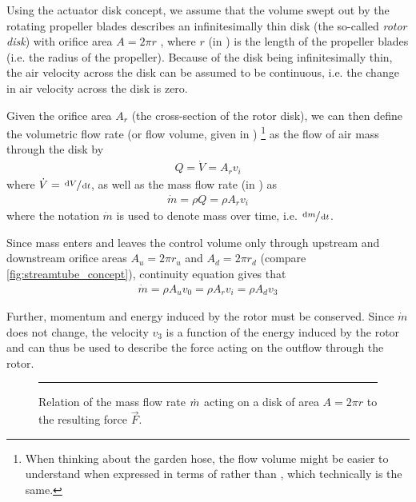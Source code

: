 Using the actuator disk concept, we assume that the volume swept out by the rotating propeller blades describes an infinitesimally thin disk (the so-called \textit{rotor disk}) with orifice area $A = 2\pi r$%
, where $r$ (in \withunit{\metre}) is the length of the propeller blades (i.e. the radius of the propeller).
Because of the disk being infinitesimally thin, the air velocity across the disk can be assumed to be continuous, i.e. the change in air velocity across the disk is zero. 

Given the orifice area $A_r$ (the cross-section of the rotor disk), we can then define the volumetric flow rate %
(or flow volume, given in \withunit{\cubic\metre\per\second})%
\footnote{When
thinking about the garden hose, the flow volume might be easier to understand when expressed in terms of  rather than , which technically is the same.}
as the flow of air mass through the disk by
%
\begin{align}
Q = \dot{V} = A_r v_i \label{eq:flowvolume}
\end{align}
%
where $\dot{V} = \sfrac{\mathop{}\!\mathrm{d} V}{\mathop{}\!\mathrm{d} t}$, as well as the mass flow rate (in \withunit{\kilo\gram\per\second}) as
%
\begin{align}
\dot{m} = \rho Q = \rho A_r v_i \label{eq:massflow}
\end{align}
%
where the notation $\dot{m}$ is used to denote mass over time, i.e. $\sfrac{\mathop{}\!\mathrm{d} m}{\mathop{}\!\mathrm{d} t}$. %

Since mass enters and leaves the control volume only through upstream and downstream orifice areas $A_u = 2 \pi r_u$ and $A_d = 2 \pi r_d$ (compare \cref{fig:streamtube_concept}), continuity equation gives that 
%
\begin{align}
\dot{m} = \rho A_u v_0 = \rho A_r v_i = \rho A_d v_3 \label{eq:massflow_continuity}
\end{align}

Further, momentum and energy induced by the rotor must be conserved. 
Since $\dot{m}$ does not change, the velocity $v_3$ is a function of the energy induced by the rotor and can thus be used to describe the force acting on the outflow through the rotor.

\begin{figure}
	\centering
	

	\rule{35em}{0.5pt}
	\caption[Mass flow rate and force]
			{Relation of the mass flow rate $\dot{m}$ acting on a disk of area $A = 2\pi r$ to the resulting force $\vec{F}$.}
	\label{fig:mass_flow_force}
\end{figure}

